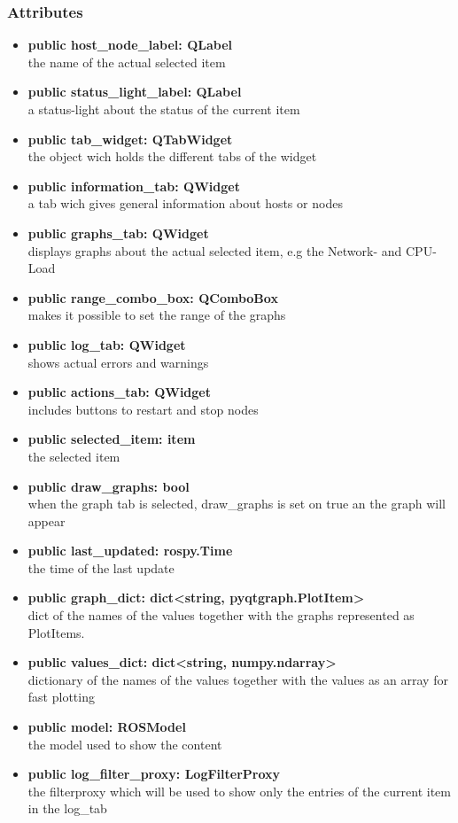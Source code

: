 \subsubsection{Attributes}
\begin{itemize}
  \item \textbf{public host\_node\_label: QLabel}\\
  the name of the actual selected item
  \item \textbf{public status\_light\_label: QLabel}\\
  a status-light about the status of the current item
  \item \textbf{public tab\_widget: QTabWidget}\\
  the object wich holds the different tabs of the widget
  \item \textbf{public information\_tab: QWidget}\\
  a tab wich gives general information about hosts or nodes 
  \item \textbf{public graphs\_tab: QWidget}\\
  displays graphs about the actual selected item, e.g the Network- and
  CPU-Load
  \item \textbf{public range\_combo\_box: QComboBox}\\
  makes it possible to set the range of the graphs
  \item \textbf{public log\_tab: QWidget}\\
  shows actual errors and warnings
  \item \textbf{public actions\_tab: QWidget}\\
  includes buttons to restart and stop nodes
  \item \textbf{public selected\_item: item}\\
  the selected item
  \item \textbf{public draw\_graphs: bool}\\
  when the graph tab is selected, draw\_graphs is set on true an the graph will
  appear
  \item \textbf{public last\_updated: rospy.Time}\\
  the time of the last update
  \item \textbf{public graph\_dict: dict<string, pyqtgraph.PlotItem>}\\
  dict of the names of the values together with the graphs represented as PlotItems.
  \item \textbf{public values\_dict: dict<string, numpy.ndarray>}\\
  dictionary of the names of the values together with the values as an array for fast plotting
  \item \textbf{public model: ROSModel}\\
  the model used to show the content
  \item \textbf{public log\_filter\_proxy: LogFilterProxy}\\
  the filterproxy which will be used to show only the entries of the current item in the log\_tab
  
\end{itemize}

